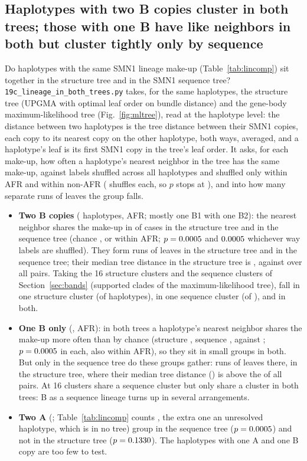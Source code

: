 \subsection{Haplotypes with two B copies cluster in both trees; those with one B have like neighbors in both but cluster tightly only by sequence}\label{sec:lintrees}
Do haplotypes with the same SMN1 lineage make-up (Table~\ref{tab:lincomp}) sit together in the structure tree and in
the SMN1 sequence tree? \texttt{19c\_lineage\_in\_both\_trees.py} takes, for the same \tmHaps{} haplotypes,
the structure tree (UPGMA with optimal leaf order on bundle distance) and the gene-body maximum-likelihood tree
(Fig.~\ref{fig:mltree}), read at the haplotype level: the distance between two haplotypes is the tree distance
between their SMN1 copies, each copy to its nearest copy on the other haplotype, both ways, averaged, and a haplotype's
leaf is its first SMN1 copy in the tree's leaf order. It asks, for each
make-up, how often a haplotype's nearest neighbor in the tree has the same make-up, against labels shuffled across all
haplotypes and shuffled only within AFR and within non-AFR (\tmPerm{} shuffles each, so $p$ stops at \tmPmin), and
into how many separate runs of leaves the group falls.
\begin{itemize}
\item \textbf{Two B copies} (\tmBBn{} haplotypes, \tmBBafr{} AFR; mostly one B1 with one B2): the nearest neighbor
shares the make-up in \tmBBnnStruct{} of cases in the structure tree and \tmBBnnSeq{} in the sequence tree (chance
\tmBBchanceStruct, or \tmBBchanceAfrStruct{} within AFR; $p=0.0005$ and $0.0005$ whichever way labels are
shuffled). They form \tmBBrunsStruct{} runs of leaves in the structure tree and \tmBBrunsSeq{} in the sequence tree;
their median tree distance in the structure tree is \tmBBmedStruct, against \tmMedAll{} over all pairs. Taking the 16 structure
clusters and the sequence clusters of Section~\ref{sec:bands} (supported clades of the maximum-likelihood tree), \tmBBkStruct{} fall in one structure cluster (of \tmBBkStructSize{} haplotypes), \tmBBkSeq{} in
one sequence cluster (of \tmBBkSeqSize), and \tmBBkBoth{} in both.
\item \textbf{One B only} (\tmBn, \tmBafr{} AFR): in both trees a haplotype's nearest neighbor shares the make-up
more often than by chance (structure \tmBnnStruct, sequence \tmBnnSeq, against \tmBchanceStruct; $p=0.0005$ in each,
also within AFR), so they sit in small groups in both. But only in the sequence tree do these groups gather: \tmBrunsSeq{}
runs of leaves there, \tmBrunsStruct{} in the structure tree, where their median tree distance (\tmBmedStruct) is above
the \tmMedAll{} of all pairs. At 16 clusters \tmBkSeq{} share a sequence cluster but only
\tmBkBoth{} share a cluster in both trees: B as a sequence lineage turns up in several arrangements.
\item \textbf{Two A} (\tmAAn; Table~\ref{tab:lincomp} counts \ldCompAA, the extra one an unresolved haplotype, which is in
no tree) group in the sequence tree ($p=0.0005$) and not in the structure tree
($p=0.1330$). The \tmABn{} haplotypes with one A and one B copy are too few to test.
\end{itemize}

